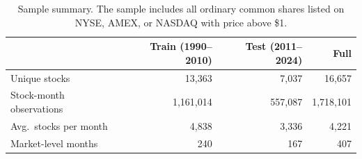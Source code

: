 \begin{table}[H]
\centering
\begin{tabular}{l r r r}
\toprule
 & Train (1990--2010) & Test (2011--2024) & Full \\
\midrule
Unique stocks & 13{,}363 & 7{,}037 & 16{,}657 \\
Stock-month observations & 1{,}161{,}014 & 557{,}087 & 1{,}718{,}101 \\
Avg.\ stocks per month & 4{,}838 & 3{,}336 & 4{,}221 \\
Market-level months & 240 & 167 & 407 \\
\bottomrule
\end{tabular}
\caption{Sample summary. The sample includes all ordinary common shares listed on NYSE, AMEX, or NASDAQ with price above \$1.}
\label{tab:sample_summary}
\end{table}
